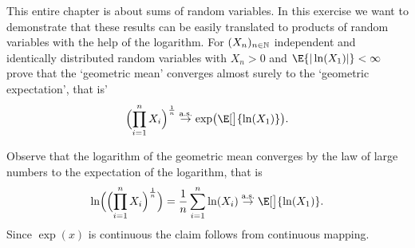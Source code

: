 
\begin{exercise}[subtitle={Products of random variables \Coffeecup}]
    This entire chapter is about sums of random variables. In this exercise we want
    to demonstrate that these results can be easily translated to products of
    random variables with the help of the logarithm. For
    \((X_n)_{n\in \mathbb{N}}\) independent and identically distributed random variables
    with \(X_n > 0\) and \(\E{|\ln(X_1)|} < \infty\) prove that the
    `geometric mean' converges almost surely to the `geometric expectation',
    that is'
    \[
        \Bigl(\prod_{i=1}^n X_i \Bigr)^\frac1n
        \overset{\as}\to \exp\bigl(\E[\big]{\ln(X_1)}\bigr).
    \]
\end{exercise}

\begin{solution}
    Observe that the logarithm of the geometric mean converges by the law of
    large numbers to the expectation of the logarithm, that is
    \[
        \ln\Bigl(\Bigl(\prod_{i=1}^n X_i \Bigr)^\frac1n\Bigr)
        = \frac1n \sum_{i=1}^n \ln(X_i)
        \overset{\as}\to \E[\big]{\ln(X_1)}.
    \]
    Since \(\exp(x)\) is continuous the claim follows from continuous mapping.
\end{solution}
